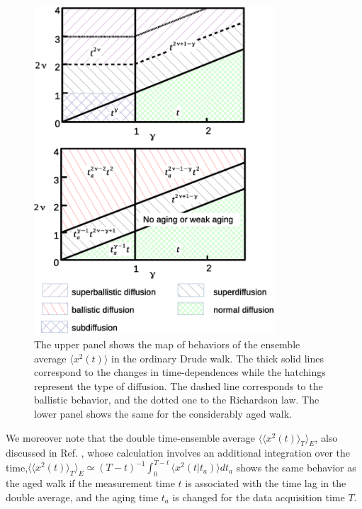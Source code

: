 \begin{figure}[h!]
\begin{center}
\includegraphics[width=90mm]{pics/MSDResults.eps}
\caption{The upper panel shows the map of behaviors of the ensemble average $\langle x^2(t) \rangle$ in the ordinary Drude walk. The thick solid lines correspond to the
changes in time-dependences while the hatchings represent the type of diffusion. The dashed line corresponds to the ballistic behavior, and the dotted one to the Richardson law.
The lower panel shows the same for the considerably aged walk. 
\label{MSDPlot} }
\end{center}
\end{figure}

We moreover note that the double time-ensemble average $\langle \langle x^2 (t) \rangle_T \rangle_E$, also discussed in Ref. \cite{Radons}, whose calculation involves 
an additional integration over the time,$\langle \langle x^2 (t) \rangle_T \rangle_E \simeq (T-t)^{-1} \int_0^{T-t} \langle x^2 (t|t_a) \rangle dt_a$  shows the same behavior as 
the aged walk if the measurement time $t$ is associated with the time lag in the double average, 
and the aging time $t_a$ is changed for the data acquisition time $T$.   
